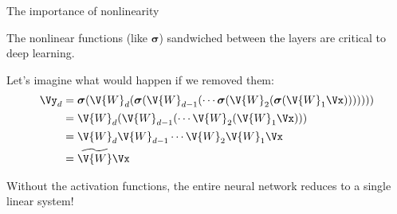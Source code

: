 \documentclass[9pt]{beamer}
\newcommand\bsigma{\boldsymbol{\sigma}}
\begin{document}
\begin{frame}{The importance of nonlinearity}

The nonlinear functions (like $\bsigma$) sandwiched between the layers are critical to deep learning.

\bigskip
Let's imagine what would happen if we removed them:
\begin{align*}
	\Vy_d &= \bsigma(\V{W}_d(\bsigma(\V{W}_{d-1}(\cdots\bsigma(\V{W}_2(\bsigma(\V{W}_1\Vx))))))) \\
		 &= \V{W}_d(\V{W}_{d-1}(\cdots\V{W}_2(\V{W}_1\Vx))) \\
		 &= \V{W}_d \V{W}_{d-1} \cdots \V{W}_2 \V{W}_1 \Vx \\
		 &= \widetilde{\V{W}}\Vx
\end{align*}

\pause
\bigskip
Without the activation functions, the entire neural network reduces to a single linear system!
	
\end{frame}
\end{document}
